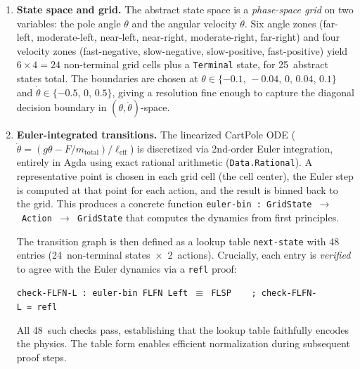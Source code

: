 \documentclass[9pt,a4paper]{article}
\theoremstyle{plain}
\theoremstyle{definition}
\theoremstyle{remark}
\begin{document}
\begin{enumerate}
\item \textbf{State space and grid.}  The abstract state space is a \emph{phase-space grid} on two variables: the pole angle $\theta$ and the angular velocity $\dot\theta$.  Six angle zones (far-left, moderate-left, near-left, near-right, moderate-right, far-right) and four velocity zones (fast-negative, slow-negative, slow-positive, fast-positive) yield $6 \times 4 = 24$ non-terminal grid cells plus a \texttt{Terminal} state, for 25~abstract states total.  The boundaries are chosen at $\theta \in \{-0.1,\, -0.04,\, 0,\, 0.04,\, 0.1\}$ and $\dot\theta \in \{-0.5,\, 0,\, 0.5\}$, giving a resolution fine enough to capture the diagonal decision boundary in $(\theta,\dot\theta)$-space.

\item \textbf{Euler-integrated transitions.}  The linearized CartPole ODE ($\ddot\theta = (g\theta - F/m_{\mathrm{total}}) / \ell_{\mathrm{eff}}$) is discretized via 2nd-order Euler integration, entirely in Agda using exact rational arithmetic (\texttt{Data.Rational}).  A representative point is chosen in each grid cell (the cell center), the Euler step is computed at that point for each action, and the result is binned back to the grid.  This produces a concrete function \texttt{euler-bin~:~GridState~$\to$~Action~$\to$~GridState} that computes the dynamics from first principles.

The transition graph is then defined as a lookup table \texttt{next-state} with 48 entries (24~non-terminal states~$\times$~2~actions).  Crucially, each entry is \emph{verified} to agree with the Euler dynamics via a \texttt{refl} proof:
\begin{center}
\texttt{check-FLFN-L~:~euler-bin~FLFN~Left~$\equiv$~FLSP~~~~;~check-FLFN-L~=~refl}
\end{center}
All 48~such checks pass, establishing that the lookup table faithfully encodes the physics.  The table form enables efficient normalization during subsequent proof steps.


\end{enumerate}
\end{document}
